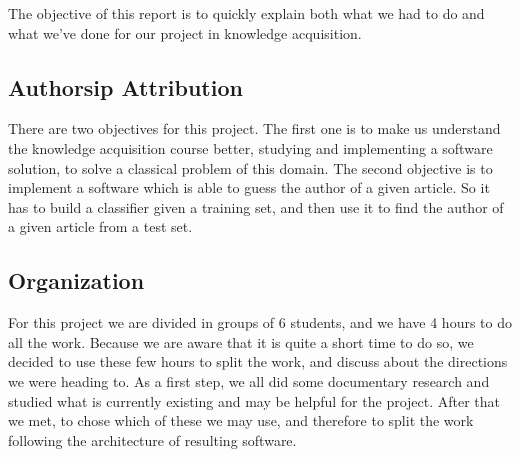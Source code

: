 The objective of this report is to quickly explain both what we had to do and what we've done for our project in knowledge acquisition. 

\subsection{Authorsip Attribution}

There are two objectives for this project. The first one is to make us understand the knowledge acquisition course better, studying and implementing a software solution, to solve a classical problem of this domain. The second objective is to implement a software which is able to guess the author of a given article. So it has to build a classifier given a training set, and then use it to find the author of a given article from a test set.

\subsection{Organization}

For this project we are divided in groups of 6 students, and we have 4 hours to do all the work. Because we are aware that it is quite a short time to do so, we decided to use these few hours to split the work, and discuss about the directions we were heading to. 
As a first step, we all did some documentary research and studied what is currently existing and may be helpful for the project. After that we met, to chose which of these we may use, and therefore to split the work following the architecture of resulting software.


